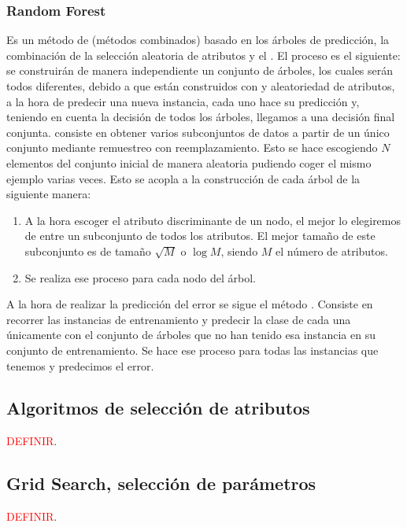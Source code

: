 \subsubsection{Random Forest \cite{breiman2001random}}

Es un método de  (métodos combinados) basado en los árboles de predicción, la combinación de la selección aleatoria de atributos y el . El proceso es el siguiente: se construirán de manera independiente un conjunto de árboles, los cuales serán todos diferentes, debido a que están construidos con  y aleatoriedad de atributos, a la hora de predecir una nueva instancia, cada uno hace su predicción y, teniendo en cuenta la decisión de todos los árboles, llegamos a una decisión final conjunta.  consiste en obtener varios subconjuntos de datos a partir de un único conjunto mediante remuestreo con reemplazamiento. Esto se hace escogiendo $N$ elementos del conjunto inicial de manera aleatoria pudiendo coger el mismo ejemplo varias veces. Esto se acopla a la construcción de cada árbol de la siguiente manera:
\begin{enumerate}
	\item A la hora escoger el atributo discriminante de un nodo, el mejor lo elegiremos de entre un subconjunto de todos los atributos. El mejor tamaño de este subconjunto es de tamaño $\sqrt{M}$ o $\log M$, siendo $M$ el número de atributos.
	\item Se realiza ese proceso para cada nodo del árbol.
\end{enumerate}
A la hora de realizar la predicción del error se sigue el método . Consiste en recorrer las instancias de entrenamiento y predecir la clase de cada una únicamente con el conjunto de árboles que no han tenido esa instancia en su conjunto de entrenamiento. Se hace ese proceso para todas las instancias que tenemos y predecimos el error.

\subsection{Algoritmos de selección de atributos} \label{subsec:selectores}
\textcolor{red}{DEFINIR}.

\subsection{Grid Search, selección de parámetros} 
\textcolor{red}{DEFINIR}.

